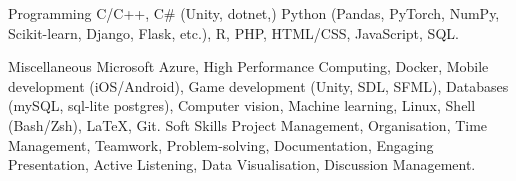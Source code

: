 

\begin{cvskills}

  \cvskill
    {Programming} %
    {C/C++, C\# (Unity, dotnet,) Python (Pandas, PyTorch, NumPy, Scikit-learn, Django, Flask, etc.), R, PHP, HTML/CSS, JavaScript, SQL.} %

  \cvskill
    {Miscellaneous} %
    {Microsoft Azure, High Performance Computing, Docker, Mobile development (iOS/Android), Game development (Unity, SDL, SFML), Databases (mySQL, sql-lite postgres), Computer vision, Machine learning, Linux, Shell (Bash/Zsh), \LaTeX, Git.} %
  \cvskill
    {Soft Skills} %
    {Project Management, Organisation, Time Management, Teamwork, Problem-solving, Documentation, Engaging Presentation, Active Listening, Data Visualisation, Discussion Management.} %

\end{cvskills}
